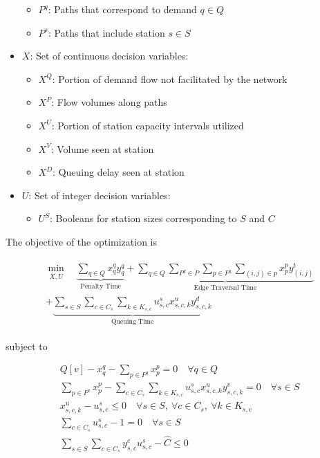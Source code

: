 \begin{itemize}
\begin{itemize}
		\item $P^q$: Paths that correspond to demand $q \in Q$
		\item $P^s$: Paths that include station $s \in S$
	\end{itemize}
	\item $X$: Set of continuous decision variables: \begin{itemize}
		\item $X^Q$: Portion of demand flow not facilitated by the network
		\item $X^P$: Flow volumes along paths
		\item $X^U$: Portion of station capacity intervals utilized
		\item $X^V$: Volume seen at station
		\item $X^D$: Queuing delay seen at station
	\end{itemize}
	\item $U$: Set of integer decision variables: \begin{itemize}
		\item $U^S$: Booleans for station sizes corresponding to $S$ and $C$
	\end{itemize}
\end{itemize}


The objective of the optimization is

\begin{gather}
	\begin{gathered}
	\min_{\overline{X},\overline{U}}\quad \underbrace{\sum_{q \in Q} x^q_qy^q_q}_{\text{Penalty Time}} + \underbrace{\sum_{q \in Q}\sum_{P^q \in P}\sum_{p \in P^q}\sum_{(i, j) \in p} x^p_py^t_{(i, j)}}_{\text{Edge Traversal Time}} \\+ \underbrace{\sum_{s \in S}\sum_{c \in C_s}
		\sum_{k \in K_{s, c}} u^s_{s, c}x^u_{s, c, k}y^d_{s, c, k}}_{\text{Queuing Time}} \label{eq:tm:obj}
	\end{gathered}
\end{gather}

subject to

\begin{gather}
	Q[v] - x^q_q - \sum_{p \in P^q}x^p_p = 0 \quad \forall q \in Q \label{eq:tm:flow_dem} \\
	\sum_{p \in P^s} x^p_p - \sum_{c \in C_s}
	\sum_{k \in K_{s, c}} u^s_{s, c}x^u_{s, c, k}y^v_{s, c, k} = 0 \quad \forall s \in S \label{eq:tm:flow_cons} \\
	x^u_{s, c, k} - u^s_{s, c} \leq 0 \quad \forall s \in S, \ \forall c \in C_s,\ \forall k\in K_{s, c} \label{eq:tm:sz_int} \\
	\sum_{c \in C_s} u^s_{s, c} - 1 = 0 \quad \forall s \in S \label{eq:tm:chg_unity} \\
	\sum_{s \in S}\sum_{c \in C_s} y^c_{s, c}u^s_{s, c} - \hat{C} \leq 0 \label{eq:tm:chg_tot}
\end{gather}

